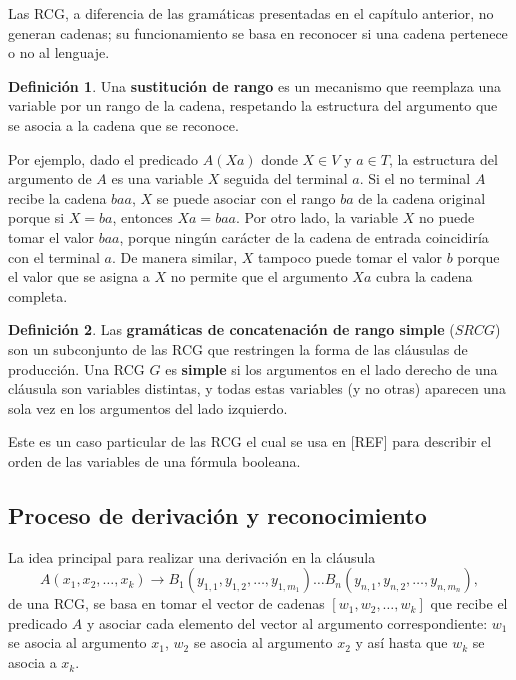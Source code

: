 \documentclass{report}
\theoremstyle{definition}
\newtheorem{definicion}{Definición}[chapter]
\theoremstyle{plain}
\theoremstyle{remark}
\begin{document}
Las RCG, a diferencia de las gramáticas presentadas en el capítulo
anterior, no generan cadenas; su funcionamiento se basa en reconocer
si una cadena pertenece o no al lenguaje.

\begin{definicion}
Una \textbf{sustitución de rango} es un mecanismo que reemplaza una
variable por un rango de la cadena, respetando la estructura del
argumento que se asocia a la cadena que se reconoce.
\end{definicion}

Por ejemplo, dado el predicado $A(Xa)$ donde $X \in V$ y $a \in T$, la
estructura del argumento de $A$ es una variable $X$ seguida del terminal
$a$. Si el no terminal $A$ recibe la cadena $baa$, $X$ se puede asociar
con el rango $ba$ de la cadena original porque si $X = ba$, entonces
$Xa = baa$. Por otro lado, la variable $X$ no puede tomar el valor
$baa$, porque ningún carácter de la cadena de entrada coincidiría con el
terminal $a$. De manera similar, $X$ tampoco puede tomar el valor $b$
porque el valor que se asigna a $X$ no permite que el argumento $Xa$
cubra la cadena completa.

\begin{definicion}
Las \textbf{gramáticas de concatenación de rango simple} ($SRCG$) son un
subconjunto de las RCG que restringen la forma de las cláusulas de
producción. Una RCG $G$ es \textbf{simple} si los argumentos en el lado
derecho de una cláusula son variables distintas, y todas estas variables
(y no otras) aparecen una sola vez en los argumentos del lado izquierdo.
\end{definicion}

Este es un caso particular de las RCG el cual se usa en
[REF] para describir el orden de las variables de una
fórmula booleana.

\subsection{Proceso de derivación y reconocimiento}

La idea principal para realizar una derivación en la cláusula
\[
  A(x_1, x_2, \dots, x_k) \to B_1(y_{1,1}, y_{1,2}, \dots, y_{1,m_1})
  \dots B_n(y_{n,1}, y_{n,2}, \dots, y_{n,m_n}),
\]
de una RCG, se basa en tomar el vector de cadenas $[w_1, w_2, \dots,
w_k]$ que recibe el predicado $A$ y asociar cada elemento del vector al
argumento correspondiente: $w_1$ se asocia al argumento $x_1$, $w_2$ se
asocia al argumento $x_2$ y así hasta que $w_k$ se asocia a $x_k$.
\end{document}

